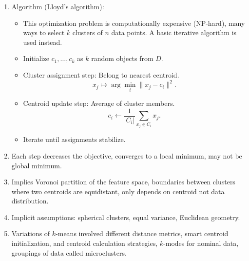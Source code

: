 \documentclass{article}
\begin{document}
\begin{enumerate}
\begin{enumerate}
\item Algorithm (Lloyd’s algorithm):
\begin{itemize}
\item This optimization problem is computationally expensive (NP-hard), many ways to select $k$ clusters of $n$ data points. A basic iterative algorithm is used instead.
\item Initialize $c_1,\dots,c_k$ as $k$ random objects from $D$.
\item Cluster assignment step: Belong to nearest centroid.
\[
x_j \mapsto \arg\min_i \|x_j - c_i \|^2.
\]
\item Centroid update step: Average of cluster members.
\[
c_i \leftarrow \frac{1}{|C_i|}\sum_{x_j \in C_i} x_j.
\]
\item Iterate until assignments stabilize.
\end{itemize}

\item Each step decreases the objective, converges to a local minimum, may not be global minimum.
\item Implies Voronoi partition of the feature space, boundaries between clusters where two centroids are equidistant, only depends on centroid not data distribution.
\item Implicit assumptions: spherical clusters, equal variance, Euclidean geometry.
\item Variations of $k$-means involved different distance metrics, smart centroid initialization, and centroid calculation strategies, $k$-modes for nominal data, groupings of data called microclusters.
\end{enumerate}


\end{enumerate}
\end{document}
